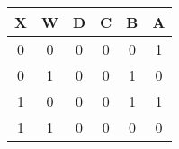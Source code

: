 \begin{tabular}{|c|c||c|c|c|c|}
\hline
X & W & D & C & B & A\\
\hline
0 & 0 & 0 & 0 & 0 & 1\\
0 & 1 & 0 & 0 & 1 & 0\\
1 & 0 & 0 & 0 & 1 & 1\\
1 & 1 & 0 & 0 & 0 & 0\\
\hline
\end{tabular}


